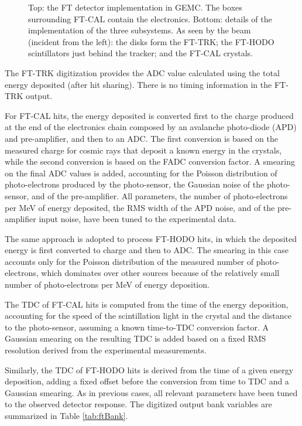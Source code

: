 \begin{figure}
	\caption{Top: the FT detector implementation in GEMC. The boxes surrounding FT-CAL contain the electronics.
			 Bottom: details of the implementation of the three subsystems. As seen by the beam (incident from the left):
             the disks form the FT-TRK; the FT-HODO scintillators just behind the tracker;
			 and the FT-CAL crystals. }
	\label{fig:ftGeometry}
\end{figure}

The FT-TRK digitization provides the ADC value calculated using the total energy deposited (after hit sharing).
There is no timing information in the FT-TRK output.

For FT-CAL hits, the energy deposited is converted first to the charge produced at the end of the electronics chain composed
by an avalanche photo-diode (APD) and pre-amplifier, and then to an ADC.
The first conversion is based on the measured charge for cosmic rays that deposit a known energy in the crystals,
while the second conversion is based on the FADC conversion factor. A smearing on the final ADC values is added,
accounting for the Poisson distribution of photo-electrons produced by the photo-sensor, the Gaussian noise of the
photo-sensor, and of the pre-amplifier. All parameters, the number of photo-electrons per MeV of energy deposited,
the RMS width of the APD noise, and of the pre-amplifier input noise, have been tuned to the experimental data.

The same approach is adopted to process FT-HODO hits, in which the deposited energy is first converted to charge and then to ADC.
The smearing in this case accounts only for the Poisson distribution of the measured number of photo-electrons,
which dominates over other sources because of the relatively small number of photo-electrons per MeV of energy deposition.

The TDC of FT-CAL hits is computed from the time of the energy deposition, accounting for the speed of the scintillation light in
the crystal and the distance to the photo-sensor, assuming a known time-to-TDC conversion factor. A Gaussian smearing on the
resulting TDC is added based on a fixed RMS resolution derived from the experimental measurements.

Similarly, the TDC of FT-HODO hits is derived from the time of a given energy deposition, adding a fixed offset before the
conversion from time to TDC and a Gaussian smearing. As in previous cases, all relevant parameters have been tuned to the
observed detector response.
The digitized output bank variables are summarized in Table \ref{tab:ftBank}.

